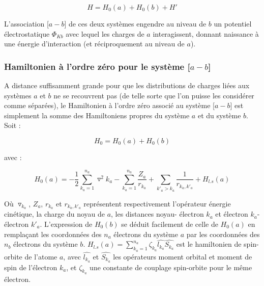 	\begin{equation}
	H = H_{0}(a) + H_{0}(b) + H'
	\end{equation}
	
	L'association [$a-b$] de ces deux systèmes engendre au niveau de $b$ un potentiel électrostatique $\Phi_{Kb}$ avec lequel les charges de $a$ interagissent, donnant naissance à une énergie d'interaction (et réciproquement au niveau de $a$).
	
	\subsubsection{Hamiltonien à l'ordre zéro pour le système [$a-b$]}
	
	A distance suffisamment grande pour que les distributions de charges liées aux systèmes $a$ et $b$ ne se recouvrent pas (de telle sorte que l'on puisse les considérer comme séparées), le Hamiltonien à l'ordre zéro associé au système [$a-b$] est simplement la somme des Hamiltoniens propres du système $a$ et du système $b$. Soit : 
	
	\begin{equation}
	H_{0} = H_{0}(a) + H_{0}(b) \label{1.2}
	\end{equation}
	
	\noindent avec : 
	
	\begin{equation}
	H_{0}(a) = -\frac{1}{2} \sum_{k_{a}=1}^{n_{a}} \triangledown^{2} k_{a} - \sum_{k_{a}=1}^{n_{a}} \frac{Z_{a}}{r_{k_{a}}} + \sum_{k'_{a}>k_{a}} \frac{1}{r_{k_{a},k'_{a}}} + H_{l.s}(a)  \label{1.3}
	\end{equation}
	
	Où $\triangledown_{k_{a}}$, $Z_{a}$, $r_{k_{a}}$ et $r_{k_{a},k'_{a}}$ représentent respectivement l'opérateur énergie cinétique, la charge du noyau de $a$, les distances noyau- électron $k_{a}$ et électron $k_{a}$- électron $k'_{a}$. L'expression de $H_{0}(b)$ se déduit facilement de celle de $H_{0}(a)$ en remplaçant les coordonnées des $n_{a}$ électrons du système $a$ par les coordonnées des $n_{b}$ électrons du système $b$. $H_{l.s}(a)= \sum_{k_{a}=1}^{n_{a}} \zeta_{k_{a}} \widehat{l_{k_{a}}} \widehat{S_{k_{a}}}$ est le hamiltonien de spin-orbite de l'atome $a$, avec $\widehat{l_{k_{a}}}$ et $\widehat{S_{k_{a}}}$ les opérateurs moment orbital et moment de spin de l'électron $k_{a}$, et $\zeta_{k_{a}}$ une constante de couplage spin-orbite pour le même électron.
	
